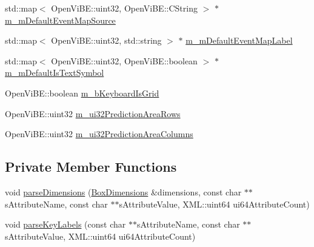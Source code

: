 \begin{DoxyCompactItemize}
\item 
std::map$<$ OpenViBE::uint32, OpenViBE::CString $>$ $\ast$ \hyperlink{classOpenViBEApplications_1_1P300ScreenLayoutReader_a7b20c682793b9f3608a01dde6d7ce53c}{m\_\-mDefaultEventMapSource}
\item 
std::map$<$ OpenViBE::uint32, std::string $>$ $\ast$ \hyperlink{classOpenViBEApplications_1_1P300ScreenLayoutReader_a597b61ffa7cebe96842f68af22f29cc6}{m\_\-mDefaultEventMapLabel}
\item 
std::map$<$ OpenViBE::uint32, OpenViBE::boolean $>$ $\ast$ \hyperlink{classOpenViBEApplications_1_1P300ScreenLayoutReader_ab7bb77c87777335f86da388594f8f61d}{m\_\-mDefaultIsTextSymbol}
\item 
OpenViBE::boolean \hyperlink{classOpenViBEApplications_1_1P300ScreenLayoutReader_aeea45d6be6df192f63cb7685e90762a0}{m\_\-bKeyboardIsGrid}
\item 
OpenViBE::uint32 \hyperlink{classOpenViBEApplications_1_1P300ScreenLayoutReader_a35c86e8f895fa80e20d02fac37475f8c}{m\_\-ui32PredictionAreaRows}
\item 
OpenViBE::uint32 \hyperlink{classOpenViBEApplications_1_1P300ScreenLayoutReader_af6b9886b7b0a9a1cd82c38e7b1a0c2fc}{m\_\-ui32PredictionAreaColumns}
\end{DoxyCompactItemize}
\subsection*{Private Member Functions}
\begin{DoxyCompactItemize}
\item 
void \hyperlink{classOpenViBEApplications_1_1P300ScreenLayoutReader_abf54906ec77d732a8edacbe18bd22aff}{parseDimensions} (\hyperlink{structOpenViBEApplications_1_1__BoxDimensions}{BoxDimensions} \&dimensions, const char $\ast$$\ast$sAttributeName, const char $\ast$$\ast$sAttributeValue, XML::uint64 ui64AttributeCount)
\item 
void \hyperlink{classOpenViBEApplications_1_1P300ScreenLayoutReader_a7f2fc2b4aceef274791e80b1c353a850}{parseKeyLabels} (const char $\ast$$\ast$sAttributeName, const char $\ast$$\ast$sAttributeValue, XML::uint64 ui64AttributeCount)
\end{DoxyCompactItemize}
